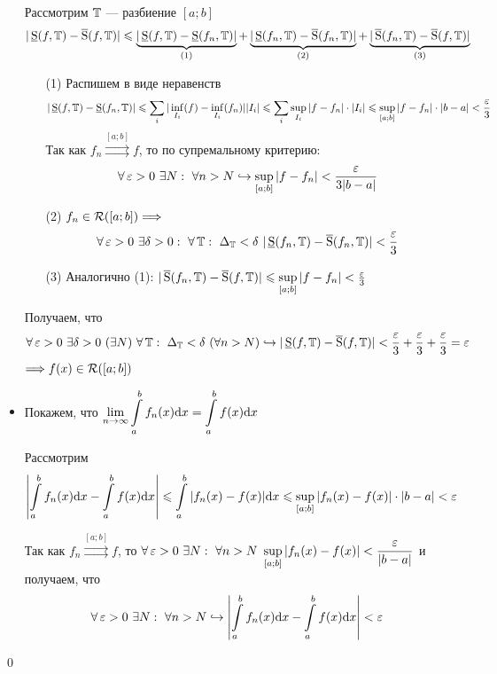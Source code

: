 \documentclass[a4paper]{article}
\begin{document}
\begin{itemize}
    Рассмотрим $\operatorname{\mathbb{T}}$ — разбиение $[a;b]$
    \begin{equation*}
        |\operatorname{\underline{S}}(f,\operatorname{\mathbb{T}})-\operatorname{\overline{S}}(f,\operatorname{\mathbb{T}})|\leqslant\underbrace{|\operatorname{\underline{S}}(f,\operatorname{\mathbb{T}})-\operatorname{\underline{S}}(f_n,\operatorname{\mathbb{T}})|}_{(1)}+\underbrace{|\operatorname{\underline{S}}(f_n,\operatorname{\mathbb{T}})-\operatorname{\overline{S}}(f_n,\operatorname{\mathbb{T}})|}_{(2)}+\underbrace{|\operatorname{\overline{S}}(f_n,\operatorname{\mathbb{T}})-\operatorname{\overline{S}}(f,\operatorname{\mathbb{T}})|}_{(3)}
    \end{equation*}
    \begin{enumerate}
        \item[(1)] Распишем в виде неравенств
        \begin{equation*}
            |\us(f,\T)-\us(f_n,\T)|\leqslant\sum_{i}|\inf\limits_{I_i}(f)-\inf\limits_{I_i}(f_n)||I_i|\leqslant \sum_{i}\sup\limits_{I_i}|f-f_n|\cdot|I_i|\leqslant\sup\limits_{[a;b]}|f-f_n|\cdot|b-a|<\frac{\ve}{3}
        \end{equation*}
        Так как $f_n\overset{[a;b]}{\rightrightarrows}f$, то по супремальному критерию:
        \begin{equation*}
            \forall\operatorname{\varepsilon}>0\ \exists N:\ \forall n>N\hookrightarrow\sup\limits_{[a;b]}|f-f_n|<\frac{\operatorname{\varepsilon}}{3|b-a|}
        \end{equation*}
        \item[(2)] $f_n\in\mathcal{R}([a;b])\Longrightarrow$
        \begin{equation*}
            \forall\ve>0\ \exists\delta>0:\ \forall\T:\ \Delta_{\T}<\delta\ |\us(f_n,\T)-\os(f_n,\T)|<\frac{\ve}{3}
        \end{equation*}
        \item[(3)] Аналогично (1): $|\operatorname{\overline{S}}(f_n,\operatorname{\mathbb{T}})-\operatorname{\overline{S}}(f,\operatorname{\mathbb{T}})|\leqslant\sup\limits_{[a;b]}|f-f_n|<\frac{\operatorname{\varepsilon}}{3}$
    \end{enumerate}
    Получаем, что
    \begin{equation*}
        \forall\ve>0\ \exists\delta>0\ (\exists N)\ \forall \T:\ \Delta_{\T}<\delta\ (\forall n>N)\hookrightarrow|\us(f,\T)-\os(f,\T)|<\frac{\ve}{3}+\frac{\ve}{3}+\frac{\ve}{3}=\ve
    \end{equation*}
    $\Longrightarrow f(x)\in\mathcal{R}([a;b])$

    \item Покажем, что $\lim\limits_{n\to\infty}\displaystyle\int\limits_{a}^b f_n(x)\text{d}x=\int\limits_{a}^b f(x)\text{d}x$
    
    Рассмотрим
    \begin{equation*}
        \left|\int\limits_{a}^b f_n(x)\text{d}x-\int\limits_{a}^b f(x)\text{d}x\right|\leqslant\int\limits_a^b|f_n(x)-f(x)|\text{d}x\leqslant\sup\limits_{[a;b]}|f_n(x)-f(x)|\cdot|b-a|<\operatorname{\varepsilon}
    \end{equation*}

    Так как $f_n\overset{[a;b]}{\rightrightarrows}f$, то $\forall\ve>0\ \exists N:\ \forall n>N\ \sup\limits_{[a;b]}|f_n(x)-f(x)|<\displaystyle\frac{\ve}{|b-a|}$ и получаем, что 
    \begin{equation*}
        \forall \operatorname{\varepsilon}>0\ \exists N:\ \forall n>N\hookrightarrow \left|\int\limits_{a}^b f_n(x)\text{d}x-\int\limits_{a}^b f(x)\text{d}x\right|<\operatorname{\varepsilon}
    \end{equation*}
\end{itemize}\qed
\end{document}
